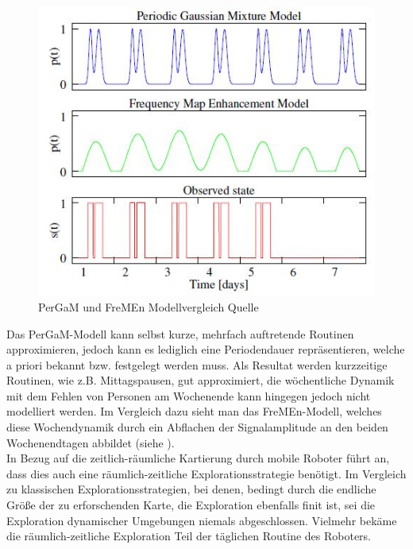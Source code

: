 \begin{figure}[!ht]
	\begin{center}
		\includegraphics[]{Abbildungen/stand_der_technik/PerGaM_vs_FreMEn}
		\caption{PerGaM und FreMEn Modellvergleich Quelle \cite{Krajnik.2015b}}
		\label{fig.PerGaM_vs_FreMEn}
	\end{center}
\end{figure}
Das PerGaM-Modell kann selbst kurze, mehrfach auftretende Routinen approximieren, jedoch kann es lediglich eine Periodendauer repräsentieren, welche a priori bekannt bzw. festgelegt werden muss. Als Resultat werden kurzzeitige Routinen, wie z.B. Mittagspausen, gut approximiert, die wöchentliche Dynamik mit dem Fehlen von Personen am Wochenende kann hingegen jedoch nicht modelliert werden. Im Vergleich dazu sieht man das FreMEn-Modell, welches diese Wochendynamik durch ein Abflachen der Signalamplitude an den beiden Wochenendtagen abbildet (siehe ). \\
In Bezug auf die zeitlich-räumliche Kartierung durch mobile Roboter führt \cite{Krajnik.2015} an, dass dies auch eine räumlich-zeitliche Explorationsstrategie benötigt. Im Vergleich zu klassischen Explorationsstrategien, bei denen, bedingt durch die endliche Größe der zu erforschenden Karte, die Exploration ebenfalls finit ist, sei die Exploration dynamischer Umgebungen niemals abgeschlossen. Vielmehr bekäme die räumlich-zeitliche Exploration Teil der täglichen Routine des Roboters.
